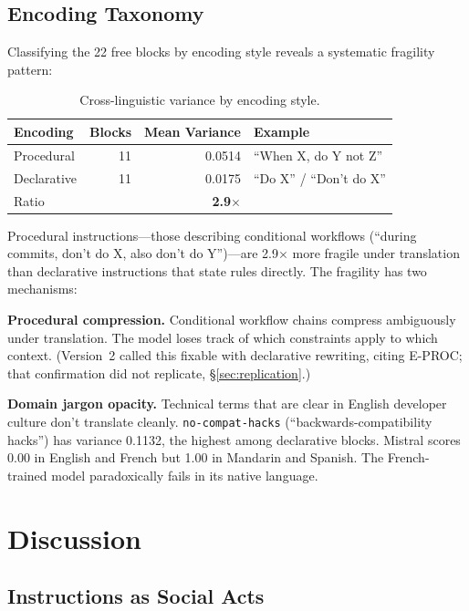 \documentclass[11pt,a4paper]{article}
\begin{document}
\subsection{Encoding Taxonomy}
\label{sec:taxonomy}

Classifying the 22 free blocks by encoding style reveals a systematic
fragility pattern:

\begin{table}[ht]
\centering
\caption{Cross-linguistic variance by encoding style.}
\label{tab:taxonomy}
\begin{tabular}{lrrl}
\toprule
Encoding & Blocks & Mean Variance & Example \\
\midrule
Procedural & 11 & 0.0514 & ``When X, do Y not Z'' \\
Declarative & 11 & 0.0175 & ``Do X'' / ``Don't do X'' \\
\midrule
\multicolumn{2}{l}{Ratio} & \textbf{2.9$\times$} & \\
\bottomrule
\end{tabular}
\end{table}

Procedural instructions---those describing conditional workflows
(``during commits, don't do X, also don't do Y'')---are 2.9$\times$
more fragile under translation than declarative instructions that
state rules directly. The fragility has two mechanisms:

\textbf{Procedural compression.} Conditional workflow chains compress
ambiguously under translation. The model loses track of which
constraints apply to which context. (Version~2 called this fixable
with declarative rewriting, citing E-PROC; that confirmation did not
replicate, \S\ref{sec:replication}.)

\textbf{Domain jargon opacity.} Technical terms that are clear in
English developer culture don't translate cleanly.
\texttt{no-compat-hacks} (``backwards-compatibility hacks'') has
variance 0.1132, the highest among declarative blocks. Mistral
scores 0.00 in English and French but 1.00 in Mandarin and
Spanish. The French-trained model paradoxically fails in its native
language.

\section{Discussion}
\label{sec:discussion}

\subsection{Instructions as Social Acts}
\end{document}
